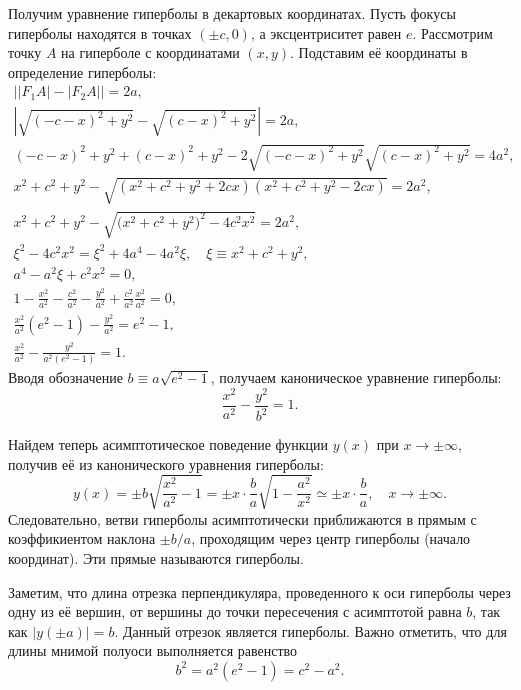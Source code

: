 Получим уравнение гиперболы в декартовых координатах. Пусть фокусы гиперболы находятся в точках $(\pm c, 0)$, а эксцентриситет равен $e$. Рассмотрим точку $A$ на гиперболе с координатами $(x,y)$. Подставим её координаты в определение гиперболы:
\begin{gather*}
	\big| |F_1 A| - |F_2 A| \big| = 2a,\\
	\left|\sqrt{(-c - x)^2 + y^2} - \sqrt{(c - x)^2 + y^2} \right| = 2a,\\
	(-c - x)^2 + y^2 + (c - x)^2 + y^2 - 2\sqrt{(-c - x)^2 + y^2}\sqrt{(c - x)^2 + y^2} = 4a^2,\\
	x^2 + c^2 + y^2  - \sqrt{(x^2 + c^2 + y^2 + 2cx ) ( x^2 + c^2 + y^2 - 2cx )} = 2a^2,\\
	x^2 + c^2 + y^2 - \sqrt{\big(x^2 + c^2 + y^2\big)^2 - 4 c^2 x^2} = 2a^2,\\
	\xi^2 - 4 c^2 x^2 = \xi^2 + 4a^4 - 4a^2\xi, \quad \xi \equiv x^2 + c^2 + y^2,\\
	a^4 - a^2 \xi + c^2x^2 = 0,\\
	1 - \frac{x^2}{a^2} - \frac{c^2}{a^2} - \frac{y^2}{a^2} + \frac{c^2}{a^2} \frac{x^2}{a^2} = 0,\\
	\frac{x^2}{a^2} (e^2 - 1) - \frac{y^2}{a^2} = e^2 - 1,\\
	\frac{x^2}{a^2} - \frac{y^2}{a^2(e^2 - 1)} = 1.
\end{gather*}
Вводя обозначение $b \equiv a \sqrt{e^2 - 1}$, получаем каноническое уравнение гиперболы:
\begin{equation}
	\frac{x^2}{a^2}-\frac{y^2}{b^2}=1.
\end{equation}

Найдем теперь асимптотическое поведение функции $y(x)$ при $x \rightarrow \pm \infty$, получив её из канонического уравнения гиперболы:
\begin{equation*}
	 y(x) = \pm b\sqrt{\frac{x^2}{a^2} - 1} =  \pm x \cdot \frac{b}{a}\sqrt{1 - \frac{a^2}{x^2}} \simeq \pm x \cdot \frac{b}{a}, \quad x \rightarrow \pm \infty.
\end{equation*}
Следовательно, ветви гиперболы асимптотически приближаются в прямым с коэффикиентом наклона $\pm b/a$, проходящим через центр гиперболы (начало координат). Эти прямые называются  гиперболы.

Заметим, что длина отрезка перпендикуляра, проведенного к оси гиперболы через одну из её вершин, от вершины до точки пересечения с асимптотой равна $b$, так как $|y(\pm a)| = b$. Данный отрезок является  гиперболы. Важно отметить, что для длины мнимой полуоси выполняется равенство
\begin{equation*}
	b^2 = a^2 (e^2 - 1) = c^2 - a^2.
\end{equation*}

